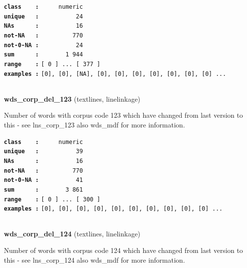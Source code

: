 \documentclass[]{article}
\begin{document}
\textbf{\texttt{class\ \ \ \ :}} \texttt{~~~~~numeric}\\
\textbf{\texttt{unique\ \ \ :}} \texttt{~~~~~~~~~~24}\\
\textbf{\texttt{NAs\ \ \ \ \ \ :}} \texttt{~~~~~~~~~~16}\\
\textbf{\texttt{not-NA\ \ \ :}} \texttt{~~~~~~~~~770}\\
\textbf{\texttt{not-0-NA\ :}} \texttt{~~~~~~~~~~24}\\
\textbf{\texttt{sum\ \ \ \ \ \ :}} \texttt{~~~~~~~1~944}\\
\textbf{\texttt{range\ \ \ \ :}}
\texttt{{[}\ 0\ {]}\ ...\ {[}\ 377\ {]}}\\
\textbf{\texttt{examples\ :}}
\texttt{{[}0{]},\ {[}0{]},\ {[}NA{]},\ {[}0{]},\ {[}0{]},\ {[}0{]},\ {[}0{]},\ {[}0{]},\ {[}0{]},\ {[}0{]}\ ...}\\

~

\textbf{wds\_corp\_del\_123} (textlines, linelinkage)

Number of words with corpus code 123 which have changed from last
version to this - see lns\_corp\_123 also wds\_mdf for more information.

\textbf{\texttt{class\ \ \ \ :}} \texttt{~~~~~numeric}\\
\textbf{\texttt{unique\ \ \ :}} \texttt{~~~~~~~~~~39}\\
\textbf{\texttt{NAs\ \ \ \ \ \ :}} \texttt{~~~~~~~~~~16}\\
\textbf{\texttt{not-NA\ \ \ :}} \texttt{~~~~~~~~~770}\\
\textbf{\texttt{not-0-NA\ :}} \texttt{~~~~~~~~~~41}\\
\textbf{\texttt{sum\ \ \ \ \ \ :}} \texttt{~~~~~~~3~861}\\
\textbf{\texttt{range\ \ \ \ :}}
\texttt{{[}\ 0\ {]}\ ...\ {[}\ 300\ {]}}\\
\textbf{\texttt{examples\ :}}
\texttt{{[}0{]},\ {[}0{]},\ {[}0{]},\ {[}0{]},\ {[}0{]},\ {[}0{]},\ {[}0{]},\ {[}0{]},\ {[}0{]},\ {[}0{]}\ ...}\\

~

\textbf{wds\_corp\_del\_124} (textlines, linelinkage)

Number of words with corpus code 124 which have changed from last
version to this - see lns\_corp\_124 also wds\_mdf for more information.
\end{document}
